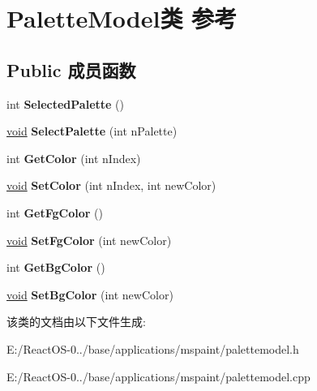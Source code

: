 \hypertarget{class_palette_model}{}\section{Palette\+Model类 参考}
\label{class_palette_model}
\subsection*{Public 成员函数}
\begin{DoxyCompactItemize}
\item 
\mbox{\label{class_palette_model_aec0e45eaa1163410c26d54375f546685}} 
int {\bfseries Selected\+Palette} ()
\item 
\mbox{\label{class_palette_model_aba4a84c237a5d9b8db89c910a1fbecb5}} 
\hyperlink{interfacevoid}{void} {\bfseries Select\+Palette} (int n\+Palette)
\item 
\mbox{\label{class_palette_model_a703fa86f3f0b0c94b846ba90a1a2ace5}} 
int {\bfseries Get\+Color} (int n\+Index)
\item 
\mbox{\label{class_palette_model_ae572da3afd5d570d56c408c1f0e902f4}} 
\hyperlink{interfacevoid}{void} {\bfseries Set\+Color} (int n\+Index, int new\+Color)
\item 
\mbox{\label{class_palette_model_ab40caa696ace76c094baed05d678914b}} 
int {\bfseries Get\+Fg\+Color} ()
\item 
\mbox{\label{class_palette_model_afa67f5b4699e7fd5e8bcf4e4467dc2c5}} 
\hyperlink{interfacevoid}{void} {\bfseries Set\+Fg\+Color} (int new\+Color)
\item 
\mbox{\label{class_palette_model_ad86ed21b9ae21df4e805544a18e1af6f}} 
int {\bfseries Get\+Bg\+Color} ()
\item 
\mbox{\label{class_palette_model_a28eee1bdc8f55f77ecea99d54f25f873}} 
\hyperlink{interfacevoid}{void} {\bfseries Set\+Bg\+Color} (int new\+Color)
\end{DoxyCompactItemize}


该类的文档由以下文件生成\+:\begin{DoxyCompactItemize}
\item 
E\+:/\+React\+O\+S-\/0../base/applications/mspaint/palettemodel.\+h\item 
E\+:/\+React\+O\+S-\/0../base/applications/mspaint/palettemodel.\+cpp\end{DoxyCompactItemize}
